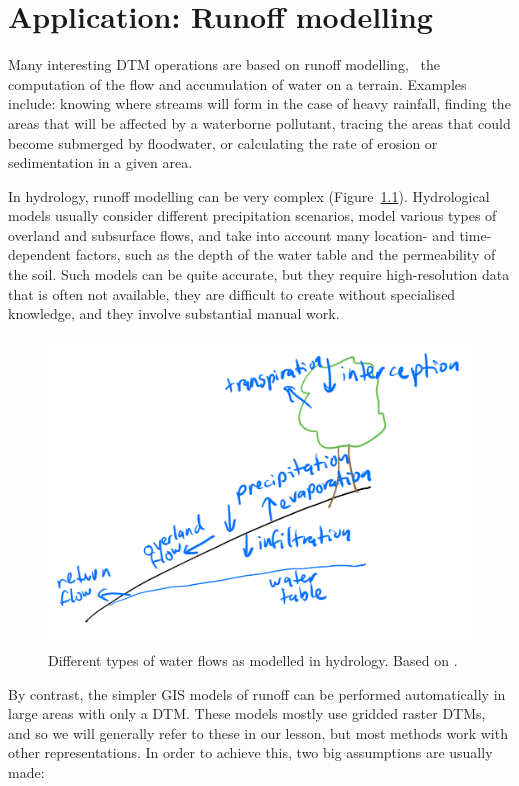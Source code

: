 
\graphicspath{{runoff/}}


\nobibliography*


\chapter{Application: Runoff modelling}

Many interesting DTM operations are based on runoff modelling, \ie\ the computation of the flow and accumulation of water on a terrain.
Examples include: knowing where streams will form in the case of heavy rainfall, finding the areas that will be affected by a waterborne pollutant, tracing the areas that could become submerged by floodwater, or calculating the rate of erosion or sedimentation in a given area.

In hydrology, runoff modelling can be very complex (Figure~\ref{fig:hydrology}).
Hydrological models usually consider different precipitation scenarios, model various types of overland and subsurface flows, and take into account many location- and time-dependent factors, such as the depth of the water table and the permeability of the soil.
Such models can be quite accurate, but they require high-resolution data that is often not available, they are difficult to create without specialised knowledge, and they involve substantial manual work.

\begin{figure}[htbp]
\centering
\includegraphics[width=0.75\linewidth]{figs/hydrology.pdf}
\caption{Different types of water flows as modelled in hydrology. Based on \citet{Beven12}.}%
\label{fig:hydrology}
\end{figure}

By contrast, the simpler GIS models of runoff can be performed automatically in large areas with only a DTM\@.
These models mostly use gridded raster DTMs, and so we will generally refer to these in our lesson, but most methods work with other representations.
In order to achieve this, two big assumptions are usually made:

